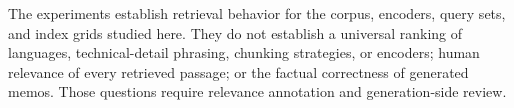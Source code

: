 The experiments establish retrieval behavior for the corpus, encoders, query sets, and index grids studied here. They do not establish a universal ranking of languages, technical-detail phrasing, chunking strategies, or encoders; human relevance of every retrieved passage; or the factual correctness of generated memos. Those questions require relevance annotation and generation-side review.
